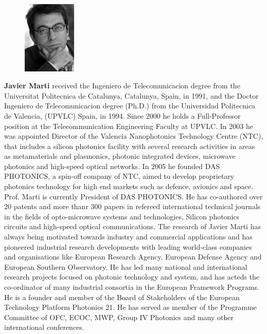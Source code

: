 \documentclass[journal]{IEEEtran}
\newcommand{\extraSpace}{\vspace{30pt}}
\begin{document}
\begin{figure}
\includegraphics[width=1in]{javier}
\end{figure}
\textbf{Javier Marti} received the Ingeniero de Telecomunicacion degree from the Universitat Politecnica de Catalunya, Catalunya, Spain, in 1991, and the Doctor Ingeniero de Telecomunicacion degree (Ph.D.) from the Universidad Politecnica de Valencia, (UPVLC) Spain, in 1994. Since 2000 he holds a Full-Professor position at the Telecommunication Engineering Faculty at UPVLC. In 2003 he was appointed Director of the Valencia Nanophotonics Technology Centre (NTC), that includes a silicon photonics facility with several research activities in areas as metamaterials and plasmonics, photonic integrated devices, microwave photonics and high-speed optical networks. In 2005 he founded DAS PHOTONICS, a spin-off company of NTC, aimed to develop proprietary photonics technology for high end markets such as  defence, avionics and space. Prof. Marti is currently President of DAS PHOTONICS.
He has co-authored over 20 patents and more thanr 300 papers in refereed international technical journals in the fields of opto-microwave systems and technologies, Silicon photonics circuits and high-speed optical communications.
The research of Javier Marti has always being motivated towards industry and commercial applications and has pioneered industrial research developments with leading world-class companies and organisations like European Research Agency, European Defense Agency and European Southern Observatory. He has led many national and international research projects focused on photonic technology and system, and has acteds the co-ordinator of many industrial consortia in the European Framework Programs. He is a founder and member of the Board of Stakeholders of the European Technology Platform Photonics 21. He has served as member of the Programme Committee of OFC, ECOC, MWP, Group IV Photonics and many other international conferences.
\extraSpace
\end{document}
